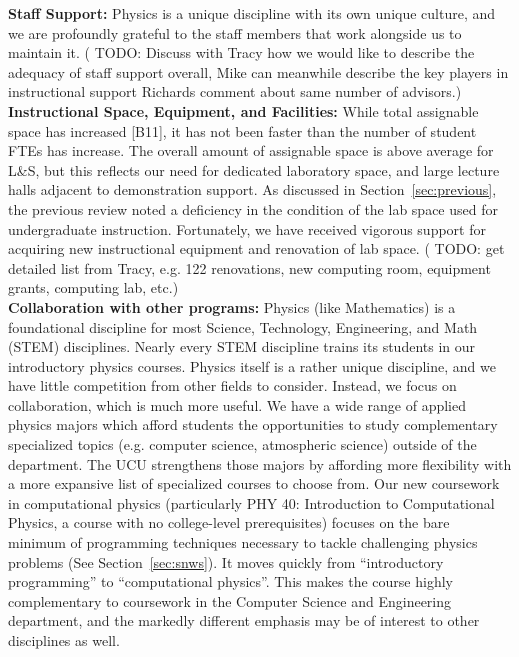 \documentclass[12pt]{article}
\begin{document}
\noindent
{\bf Staff Support:}
Physics is a unique discipline with its own unique culture, and we are profoundly grateful to 
the staff members that work alongside us to maintain it.
({\color{red} TODO:  Discuss with Tracy how we would like to describe the adequacy of staff 
support overall, Mike can meanwhile describe the key players in instructional support}  
Richards comment about same number of advisors.)\\[3pt]


\noindent
{\bf Instructional Space, Equipment, and Facilities:} While total
assignable space has increased [B11], it has not been faster than the
number of student FTEs has increase.  The overall amount of assignable
space is above average for L\&S, but this reflects our need for
dedicated laboratory space, and large lecture halls adjacent to
demonstration support.  As discussed in Section~\ref{sec:previous},
the previous review noted a deficiency in the condition of the lab
space used for undergraduate instruction.  Fortunately, we have
received vigorous support for acquiring new instructional equipment
and renovation of lab space.  ({\color{red} TODO: get detailed list
  from Tracy, e.g. 122 renovations, new computing room, equipment
  grants, computing lab, etc}.)\\[3pt]

\noindent
{\bf Collaboration with other programs: } Physics (like Mathematics)
is a foundational discipline for most Science, Technology,
Engineering, and Math (STEM) disciplines.  Nearly every STEM
discipline trains its students in our introductory physics courses.
Physics itself is a rather unique discipline, and we have little
competition from other fields to consider.  Instead, we focus on
collaboration, which is much more useful.  We have a wide range of
applied physics majors which afford students the opportunities to
study complementary specialized topics (e.g. computer science,
atmospheric science) outside of the department.  The UCU strengthens
those majors by affording more flexibility with a more expansive list
of specialized courses to choose from.  Our new coursework in
computational physics (particularly PHY 40: Introduction to
Computational Physics, a course with no college-level prerequisites)
focuses on the bare minimum of programming techniques necessary to
tackle challenging physics problems (See Section~\ref{sec:snws}).  It
moves quickly from ``introductory programming'' to
``computational physics''.  This makes the course highly complementary
to coursework in the Computer Science and Engineering department, and the markedly different 
emphasis may be of interest to other disciplines as well.\\[3pt]
\end{document}
